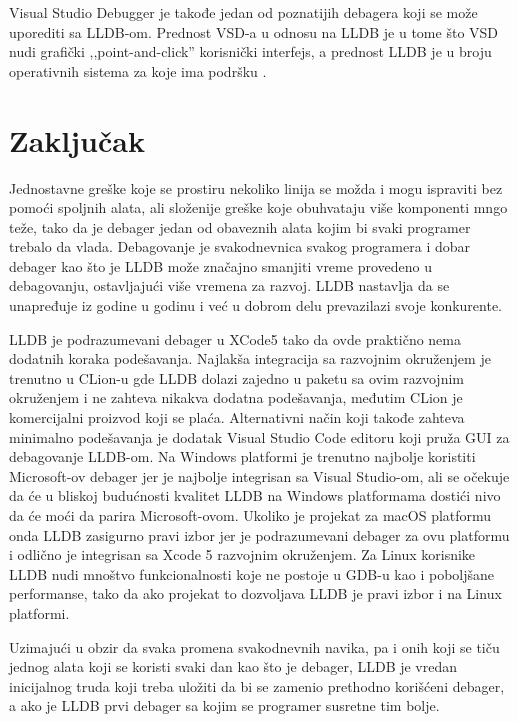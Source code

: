 \documentclass[a4paper]{article}
\begin{document}
Visual Studio Debugger je takođe jedan od poznatijih debagera koji se može uporediti sa LLDB-om. Prednost VSD-a u odnosu na LLDB je u tome što VSD nudi grafički ,,point-and-click'' korisnički interfejs, a prednost LLDB je u broju operativnih sistema za koje ima podršku \cite{vsd}.
\section{Zaključak}
\label{sec:zakljucak}

Jednostavne greške koje se prostiru nekoliko linija se možda i mogu ispraviti bez pomoći spoljnih alata, ali složenije greške koje obuhvataju više komponenti mngo teže, tako da je debager jedan od obaveznih alata kojim bi svaki programer trebalo da vlada.
Debagovanje je svakodnevnica svakog programera i dobar debager kao što je LLDB može značajno smanjiti vreme provedeno u debagovanju, ostavljajući više vremena za razvoj. LLDB nastavlja da se unapređuje iz godine u godinu i već u dobrom delu prevazilazi svoje konkurente.

LLDB je podrazumevani debager u XCode5 tako da ovde praktično nema dodatnih koraka podešavanja. Najlakša integracija sa razvojnim okruženjem je trenutno u CLion-u gde LLDB dolazi zajedno u paketu sa ovim razvojnim okruženjem i ne zahteva nikakva dodatna podešavanja, međutim CLion je komercijalni proizvod koji se plaća. Alternativni način koji takođe zahteva minimalno podešavanja je dodatak Visual Studio Code editoru koji pruža GUI za debagovanje LLDB-om. Na Windows platformi je trenutno najbolje koristiti Microsoft-ov debager jer je najbolje integrisan sa Visual Studio-om, ali se očekuje da će u bliskoj budućnosti kvalitet LLDB na Windows platformama dostići nivo da će moći da parira Microsoft-ovom. Ukoliko je projekat za macOS platformu onda LLDB zasigurno pravi izbor jer je podrazumevani debager za ovu platformu i odlično je integrisan sa Xcode 5 razvojnim okruženjem. Za Linux korisnike LLDB nudi mnoštvo funkcionalnosti koje ne postoje u GDB-u kao i poboljšane performanse, tako da ako projekat to dozvoljava LLDB je pravi izbor i na Linux platformi.
 
Uzimajući u obzir da svaka promena svakodnevnih navika, pa i onih koji se tiču jednog alata koji se koristi svaki dan kao što je debager, LLDB je vredan inicijalnog truda koji treba uložiti da bi se zamenio prethodno korišćeni debager, a ako je LLDB prvi debager sa kojim se programer susretne tim bolje.
\appendix
 

\end{document}
